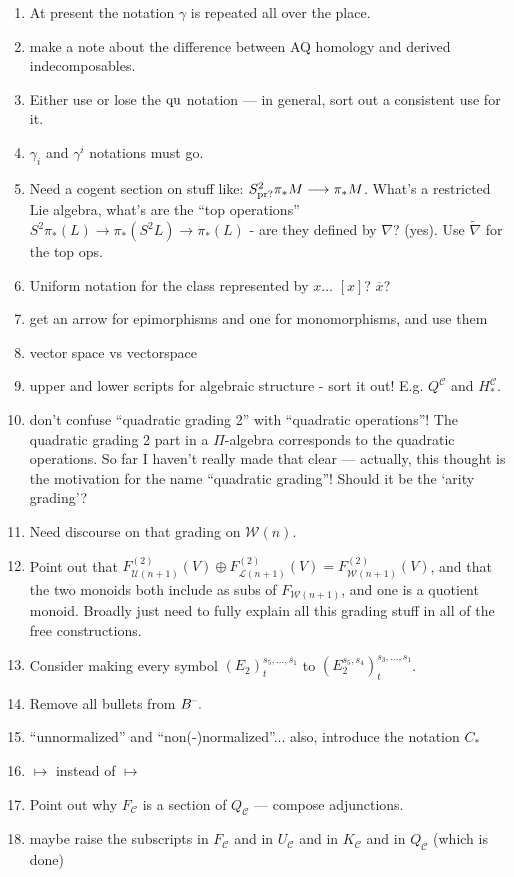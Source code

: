 \documentclass[11pt]{amsart}
\theoremstyle{plain}
\theoremstyle{definition}
\newcommand{\DASH}{\textup{--}}
\renewcommand{\to}{\longrightarrow}
\newcommand{\calW}{\mathcal{W}}
\newcommand{\calU}{\mathcal{U}}
\newcommand{\calL}{\mathcal{L}}
\newcommand{\calC}{\mathcal{C}}
\theoremstyle{plain}
\newcommand{\quadratic}{\textup{qu}}
\begin{document}
\begin{todolist}
\begin{enumerate}
\item At present the notation $\gamma$ is repeated all over the place.
\item make a note about the difference between AQ homology and derived indecomposables.
\item Either use or lose the $\quadratic$ notation --- in general, sort out a consistent use for it.
\item $\gamma_i$ and $\gamma^i$ notations must go.
\item Need a cogent section on stuff like: $S^2_\textup{pr?}\pi_*M\to \pi_*M$. What's a restricted Lie algebra, what's are the ``top operations'' $S^2\pi_*(L)\to \pi_*(S^2L)\to \pi_*(L)$ - are they defined by $\nabla$? (yes). Use $\widetilde{\nabla}$ for the top ops.
\item Uniform notation for the class represented by $x$... $[x]$? $\overline{x}$?
\item get an arrow for epimorphisms and one for monomorphisms, and use them
\item vector space vs vectorspace
\item upper and lower scripts for algebraic structure - sort it out! E.g. $Q^\calC$ and $H_*^\calC$.
\item don't confuse ``quadratic grading 2'' with ``quadratic operations''! The quadratic grading 2 part in a $\Pi$-algebra corresponds to the quadratic operations. So far I haven't really made that clear --- actually, this thought is the motivation for the name ``quadratic grading''! Should it be the `arity grading'?
\item Need discourse on that grading on $\calW(n)$.
\item Point out that $F_{\calU(n+1)}^{(2)}(V)\oplus F_{\calL(n+1)}^{(2)}(V)=F_{\calW(n+1)}^{(2)}(V)$, and that the two monoids both include as subs of $F_{\calW(n+1)}$, and one is a quotient monoid. Broadly just need to fully explain all this grading stuff in all of the free constructions.
\item Consider making every symbol $(E_2)^{s_5,\ldots,s_1}_t$ to $(E_2^{s_5,s_4})^{s_3,\ldots,s_1}_t$.
\item Remove all bullets from $B^{\DASH}.$
\item ``unnormalized'' and ``non(-)normalized''... also, introduce the notation $C_*$
\item $\longmapsto$ instead of $\mapsto$
\item Point out why $F_\calC$ is a section of $Q_{\calC}$ --- compose adjunctions.
\item maybe raise the subscripts in $F_\calC$ and in $U_\calC$ and in $K_\calC$ and in $Q_\calC$ (which is done)

\end{enumerate}
\end{todolist}
\end{document}
